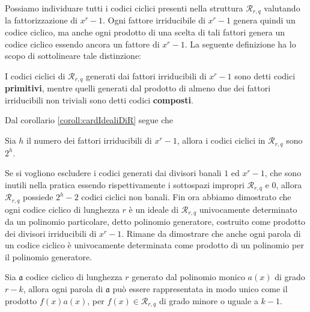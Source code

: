 \noindent
Possiamo individuare tutti i codici ciclici presenti nella struttura $\mathcal{R}_{r, q}$ valutando la fattorizzazione di $x^r-1$. Ogni fattore irriducibile di $x^r - 1$ genera quindi un codice ciclico, ma anche ogni prodotto di una scelta di tali fattori genera un codice ciclico essendo ancora un fattore di $x^r - 1$. La seguente definizione ha lo scopo di sottolineare tale distinzione:
\begin{definizione}
   I codici ciclici di $\mathcal{R}_{r, q}$ generati dai fattori irriducibili di $x^r-1$ sono detti codici {\bf primitivi}, mentre quelli generati dal prodotto di almeno due dei fattori irriducibili non triviali sono detti codici {\bf composti}. 
\end{definizione}
\noindent
Dal corollario \ref{coroll:cardIdealiDiR} segue che 
\begin{corollario}
   Sia $h$ il numero dei fattori irriducibili di $x^r - 1$, allora i codici ciclici in $\mathcal{R}_{r, q}$ sono $2^h$.
\end{corollario}
\noindent
Se si vogliono escludere i codici generati dai divisori banali $1$ ed $x^r -1$, che sono inutili nella pratica essendo rispettivamente i sottospazi impropri $\mathcal{R}_{r, q}$ e $0$, allora $\mathcal{R}_{r, q}$ possiede $2^h - 2$ codici ciclici non banali. 
Fin ora abbiamo dimostrato che ogni codice ciclico di lunghezza $r$ è un ideale di $\mathcal{R}_{r, q}$ univocamente determinato da un polinomio particolare, detto polinomio generatore, costruito come prodotto dei divisori irriducibili di $x^r - 1$. Rimane da dimostrare che anche ogni parola di un codice ciclico è univocamente determinata come prodotto di un polinomio per il polinomio generatore. 
\begin{teorema}
   Sia $\mathfrak{a}$ codice ciclico di lunghezza $r$ generato dal polinomio monico $a(x)$ di grado $r-k$, allora ogni parola di $\mathfrak{a}$ può essere rappresentata in modo unico come il prodotto $f(x)a(x)$, per $f(x) \in \mathcal{R}_{r, q}$ di grado minore o uguale a $k-1$.
\end{teorema}
